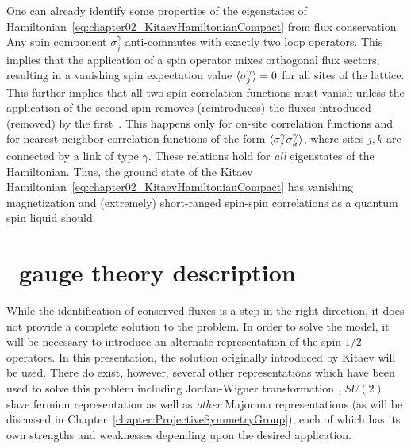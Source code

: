 One can already identify some properties of the eigenstates of Hamiltonian~\eqref{eq:chapter02_KitaevHamiltonianCompact} from flux conservation.
Any spin component $\sigma_j^{\gamma}$ anti-commutes with exactly two loop operators.
This implies that the application of a spin operator mixes orthogonal flux sectors, resulting in a vanishing spin expectation value $\langle \sigma_j^{\gamma} \rangle = 0$ for all sites of the lattice.
This further implies that all two spin correlation functions must vanish unless the application of the second spin removes (reintroduces) the fluxes introduced (removed) by the first~\cite{BaskaranPRL2007}.
This happens only for on-site correlation functions and for nearest neighbor correlation functions of the form $\langle \sigma_j^{\gamma} \sigma_k^{\gamma} \rangle$, where sites $j, k$ are connected by a link of type $\gamma$.
These relations hold for \textit{all} eigenstates of the Hamiltonian.
Thus, the ground state of the Kitaev Hamiltonian~\eqref{eq:chapter02_KitaevHamiltonianCompact} has vanishing magnetization and (extremely) short-ranged spin-spin correlations as a quantum spin liquid should.


%
%
\section{\texorpdfstring{\ZZ}{Z2}~gauge theory description}
\label{section:chapter02_Z2GaugeTheory}
%
%
While the identification of conserved fluxes is a step in the right direction, it does not provide a complete solution to the problem.
In order to solve the model, it will be necessary to introduce an alternate representation of the spin-$1/2$ operators.
In this presentation, the solution originally introduced by Kitaev \cite{KitaevAoP2006} will be used.
There do exist, however, several other representations which have been used to solve this problem including Jordan-Wigner transformation \cite{FengPRL2007}, $SU(2)$ slave fermion representation \cite{BurnellPRB2011} as well as \textit{other} Majorana representations \cite{Tsvelik2003,YouPRB2012,SeifertPRBFeb2018,SeifertPRBOct2018} (as will be discussed in Chapter~\ref{chapter:ProjectiveSymmetryGroup}), each of which has its own strengths and weaknesses depending upon the desired application.

